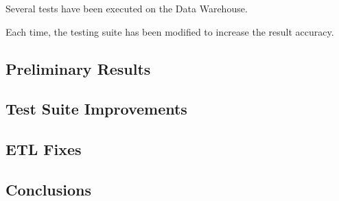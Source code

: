 Several tests have been executed on the Data Warehouse.

Each time, the testing suite has been modified to increase the result accuracy.

\subsection{Preliminary Results}
    

\subsection{Test Suite Improvements}
    
    
\subsection{ETL Fixes}
    
    
\subsection{Conclusions}
    
    

